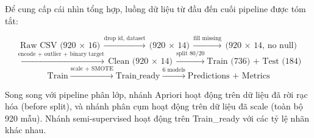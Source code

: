 Để cung cấp cái nhìn tổng hợp, luồng dữ liệu từ đầu đến cuối pipeline được tóm tắt:

$$\text{Raw CSV (920 $\times$ 16)} \xrightarrow{\text{drop id, dataset}} \text{(920 $\times$ 14)} \xrightarrow{\text{fill missing}} \text{(920 $\times$ 14, no null)}$$
$$\xrightarrow{\text{encode + outlier + binary target}} \text{Clean (920 $\times$ 14)} \xrightarrow{\text{split 80/20}} \text{Train (736) + Test (184)}$$
$$\text{Train} \xrightarrow{\text{scale + SMOTE}} \text{Train\_ready} \xrightarrow{\text{6 models}} \text{Predictions + Metrics}$$

Song song với pipeline phân lớp, nhánh Apriori hoạt động trên dữ liệu đã rời rạc hóa (before split), và nhánh phân cụm hoạt động trên dữ liệu đã scale (toàn bộ 920 mẫu). Nhánh semi-supervised hoạt động trên Train\_ready với các tỷ lệ nhãn khác nhau.
